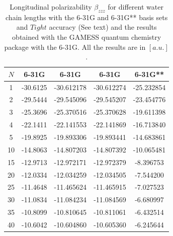 \documentclass[twocolumn,showpacs,preprintnumbers,amsmath,amssymb]{revtex4}
\begin{document}


\begin{table}
  \centering
  \caption{\protect
    Longitudinal polarizability $\beta_{zzz}$
    for different water chain lengths with the 6-31G and 6-31G** basis sets
    and $Tight$ accuracy (See text) and the results obtained with
    the GAMESS quantum chemistry package \cite{gamess} with the 6-31G. 
    All the results are in $[a.u.]$.
  }\label{tab:Polari_1D_Values}
  \begin{ruledtabular}
    \begin{tabular}{ccccc}
      $N$ &\multicolumn{1}{c}{6-31G\footnotemark[1]}
      &\multicolumn{1}{c}{6-31G\footnotemark[2]}
      &\multicolumn{1}{c}{6-31G\footnotemark[2]\footnotemark[3]}
      &\multicolumn{1}{c}{6-31G**\footnotemark[2]}\\
      \hline
      1 & -30.6125 & -30.612178 & -30.612274 & -25.232854 \\
      2 & -29.5444 & -29.545096 & -29.545207 & -23.454776 \\
      3 & -25.3696 & -25.370516 & -25.370628 & -19.611398 \\
      4 & -22.1411 & -22.141553 & -22.141869 & -16.713840 \\
      5 & -19.8925 & -19.893306 & -19.893441 & -14.683861 \\
     10 & -14.8063 & -14.807203 & -14.807392 & -10.065481 \\
     15 & -12.9713 & -12.972171 & -12.972379 &  -8.396753 \\
     20 & -12.0334 & -12.034259 & -12.034505 &  -7.544200 \\
     25 & -11.4648 & -11.465624 & -11.465915 &  -7.027523 \\
     30 & -11.0834 & -11.084234 & -11.084569 &  -6.680997 \\
     35 & -10.8099 & -10.810645 & -10.811061 &  -6.432514 \\
     40 & -10.6042 & -10.604860 & -10.605360 &  -6.245644 \\
    \end{tabular}
  \end{ruledtabular}
\end{table}
\end{document}
